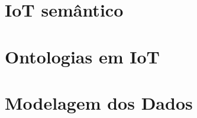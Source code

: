 \section{IoT semântico}
\cite{DEFARIAS2017128}

\section{Ontologias em IoT}

\section{Modelagem dos Dados}
